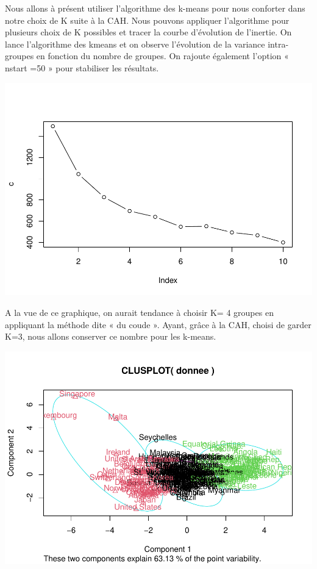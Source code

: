 \documentclass[
]{article}
\newenvironment{Shaded}{}{}
\newcommand{\AttributeTok}[1]{#1}
\newcommand{\DecValTok}[1]{#1}
\newcommand{\FunctionTok}[1]{#1}
\newcommand{\NormalTok}[1]{#1}
\newcommand{\OtherTok}[1]{\textcolor[rgb]{1.00,0.25,0.00}{#1}}
\newcommand{\SpecialCharTok}[1]{\textcolor[rgb]{0.00,0.50,0.50}{#1}}
\begin{document}
Nous allons à présent utiliser l'algorithme des k-means pour nous
conforter dans notre choix de K suite à la CAH. Nous pouvons appliquer
l'algorithme pour plusieurs choix de K possibles et tracer la courbe
d'évolution de l'inertie. On lance l'algorithme des kmeans et on observe
l'évolution de la variance intra-groupes en fonction du nombre de
groupes. On rajoute également l'option « nstart =50 » pour stabiliser
les résultats.

\includegraphics{Projet_files/figure-latex/unnamed-chunk-20-1.pdf}

A la vue de ce graphique, on aurait tendance à choisir K= 4 groupes en
appliquant la méthode dite « du coude ». Ayant, grâce à la CAH, choisi
de garder K=3, nous allons conserver ce nombre pour les k-means.

\begin{Shaded}
\end{Shaded}

\includegraphics{Projet_files/figure-latex/unnamed-chunk-21-1.pdf}
\end{document}
